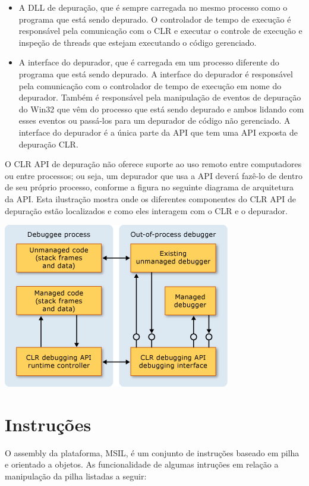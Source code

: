 \documentclass{article}
\begin{document}
\begin{itemize}
    
\item A DLL de depuração, que é sempre carregada no mesmo processo como o programa que está sendo depurado. O controlador de tempo de execução é responsável pela comunicação com o CLR e executar o controle de execução e inspeção de threads que estejam executando o código gerenciado.

\item A interface do depurador, que é carregada em um processo diferente do programa que está sendo depurado. A interface do depurador é responsável pela comunicação com o controlador de tempo de execução em nome do depurador. Também é responsável pela manipulação de eventos de depuração do Win32 que vêm do processo que está sendo depurado e ambos lidando com esses eventos ou passá-los para um depurador de código não gerenciado. A interface do depurador é a única parte da API que tem uma API exposta de depuração CLR.
\end{itemize}
O CLR API de depuração não oferece suporte ao uso remoto entre computadores ou entre processos; ou seja, um depurador que usa a API deverá fazê-lo de dentro de seu próprio processo, conforme a figura no seguinte diagrama de arquitetura da API. Esta ilustração mostra onde os diferentes componentes do CLR API de depuração estão localizados e como eles interagem com o CLR e o depurador.

\begin{center}
\includegraphics[scale=0.7]{ArquiteturaCLR.png}
\end{center}

\section{Instruções}
O assembly da plataforma, MSIL, é um conjunto de instruções baseado em
pilha e orientado a objetos. As funcionalidade de algumas intruções em relação a manipulação da pilha listadas a seguir:
\end{document}
